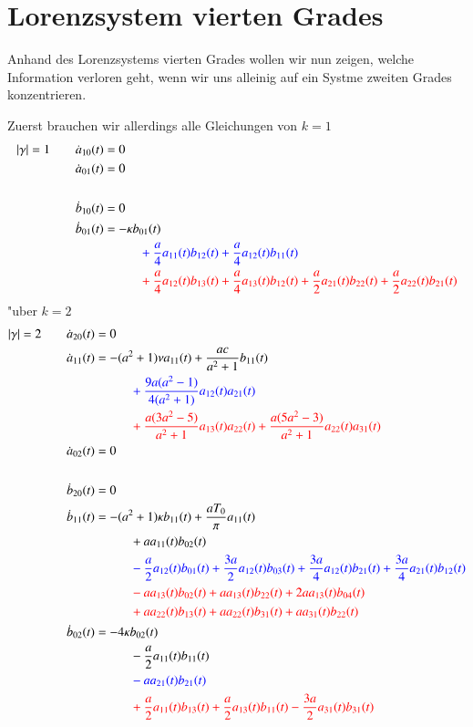 \section{Lorenzsystem vierten Grades\label{section:lorenz2:4degreelorenz}}
Anhand des Lorenzsystems vierten Grades wollen wir nun zeigen, welche 
Information verloren geht, wenn wir uns alleinig auf ein Systme zweiten Grades 
konzentrieren.

Zuerst brauchen wir allerdings alle Gleichungen von $k = 1$
\begin{align*}
|\gamma| = 1
\qquad &
\dot{a}_{10}(t) = 0
\\
&
\dot{a}_{01}(t) = 0
\\
\\
&
\dot{b}_{10}(t) = 0
\\
&
\dot{b}_{01}(t)
=
-
\kappa
b_{01}(t)
\\
&\phantom{aaaaaaaaaa}
\color{blue}
+
\frac{a}{4} a_{11}(t) b_{12}(t)
+
\frac{a}{4} a_{12}(t) b_{11}(t)
\\
&\phantom{aaaaaaaaaa}
\color{red}
+
\frac{a}{4} a_{12}(t) b_{13}(t)
+
\frac{a}{4} a_{13}(t) b_{12}(t)
+
\frac{a}{2} a_{21}(t) b_{22}(t)
+
\frac{a}{2} a_{22}(t) b_{21}(t)
\end{align*}
"uber $k = 2$
\begin{align*}
|\gamma| = 2
\qquad &
\dot{a}_{20}(t) = 0
\\
&
\dot{a}_{11}(t)
=
-
(a^2+1)
\nu
a_{11}(t)
+
\frac{a c}{a^2+1} b_{11}(t)
\\
&\phantom{aaaaaaaaaa}
\color{blue}
+
\frac{9 a (a^2 - 1)}{4 (a^2+1)} a_{12}(t) a_{21}(t)
\\
&\phantom{aaaaaaaaaa}
\color{red}
+
\frac{a (3 a^2 - 5)}{a^2+1} a_{13}(t) a_{22}(t)
+
\frac{a (5 a^2 - 3)}{a^2+1} a_{22}(t) a_{31}(t)
\\
&
\dot{a}_{02}(t) = 0
\\
\\
&
\dot{b}_{20}(t) = 0
\\
&
\dot{b}_{11}(t)
=
-
(a^2+1)
\kappa
b_{11}(t)
+
\frac{a T_{0}}{\pi} a_{11}(t)
\\
&\phantom{aaaaaaaaaa}
+
a
a_{11}(t) b_{02}(t)
\\
&\phantom{aaaaaaaaaa}
\color{blue}
-
\frac{a}{2} a_{12}(t) b_{01}(t)
+
\frac{3 a}{2} a_{12}(t) b_{03}(t)
+
\frac{3 a}{4} a_{12}(t) b_{21}(t)
+
\frac{3 a}{4} a_{21}(t) b_{12}(t)
\\
&\phantom{aaaaaaaaaa}
\color{red}
-
a
a_{13}(t) b_{02}(t)
+
a
a_{13}(t) b_{22}(t)
+
2 a
a_{13}(t) b_{04}(t)
\\
&\phantom{aaaaaaaaaa}
\color{red}
+
a
a_{22}(t) b_{13}(t)
+
a
a_{22}(t) b_{31}(t)
+
a
a_{31}(t) b_{22}(t)
\\
&
\dot{b}_{02}(t)
=
-
4
\kappa
b_{02}(t)
\\
&\phantom{aaaaaaaaaa}
-
\frac{a}{2} a_{11}(t) b_{11}(t)
\\
&\phantom{aaaaaaaaaa}
\color{blue}
-
a
a_{21}(t) b_{21}(t)
\\
&\phantom{aaaaaaaaaa}
\color{red}
+
\frac{a}{2} a_{11}(t) b_{13}(t)
+
\frac{a}{2} a_{13}(t) b_{11}(t)
-
\frac{3 a}{2} a_{31}(t) b_{31}(t)
\end{align*}
